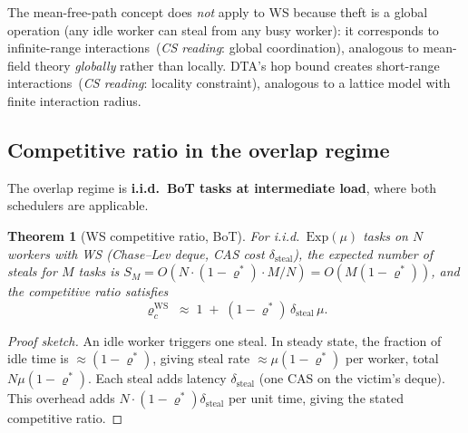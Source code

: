 \documentclass[11pt,a4paper]{article}
\newtheorem{theorem}{Theorem}[section]
\newcommand{\physics}[2]{#1\ \textnormal{(\emph{CS reading}: #2)}}
\begin{document}
The mean-free-path concept does \emph{not} apply to WS because theft
is a global operation (any idle worker can steal from any busy worker):
it corresponds to \physics{infinite-range interactions}{global coordination},
analogous to mean-field theory \emph{globally} rather than locally.
DTA's hop bound creates \physics{short-range interactions}{locality
constraint}, analogous to a lattice model with finite interaction radius.

\subsection{Competitive ratio in the overlap regime}

The overlap regime is \textbf{i.i.d.\ BoT tasks at intermediate load},
where both schedulers are applicable.

\begin{theorem}[WS competitive ratio, BoT]\label{thm:cr_ws_bot}
For i.i.d.\ $\mathrm{Exp}(\mu)$ tasks on $N$ workers with WS
(Chase--Lev deque, CAS cost $\delta_{\mathrm{steal}}$),
the expected number of steals for $M$ tasks is
$S_M = O(N \cdot (1 - \varrho^*) \cdot M / N) = O(M(1-\varrho^*))$,
and the competitive ratio satisfies
\begin{equation}\label{eq:cr_ws}
  \varrho_c^{\mathrm{WS}}
  \;\approx\;
  1 \;+\; (1 - \varrho^*)\,\delta_{\mathrm{steal}}\,\mu.
\end{equation}
\end{theorem}

\begin{proof}[Proof sketch]
An idle worker triggers one steal.  In steady state, the fraction of
idle time is $\approx (1-\varrho^*)$, giving steal rate $\approx \mu(1-\varrho^*)$
per worker, total $N\mu(1-\varrho^*)$.  Each steal adds latency $\delta_{\mathrm{steal}}$
(one CAS on the victim's deque).  This overhead adds
$N \cdot (1-\varrho^*)\delta_{\mathrm{steal}}$ per unit time, giving
the stated competitive ratio.
\end{proof}
\end{document}
